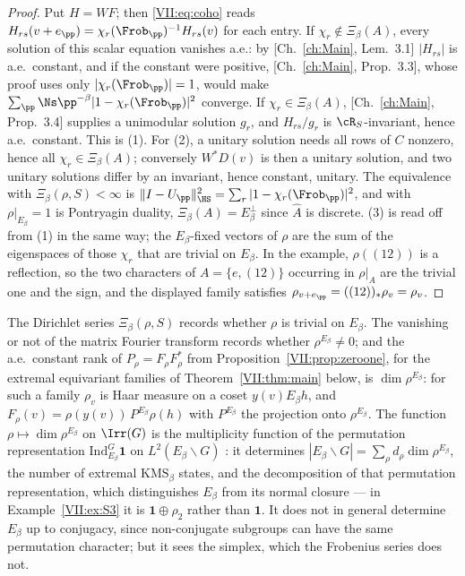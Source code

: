 \begin{proof}
Put $H=WF$; then \eqref{VII:eq:coho} reads $H_{rs}(v+e_\pp)=\chi_r(\Frob_\pp)^{-1}H_{rs}(v)$ for
each entry. If $\chi_r\notin\Xi_\beta(A)$, every solution of this scalar equation vanishes
a.e.: by [Ch.~\ref{ch:Main}, Lem.~3.1] $|H_{rs}|$ is a.e.\ constant, and if the constant were
positive, [Ch.~\ref{ch:Main}, Prop.~3.3], whose proof uses only $|\chi_r(\Frob_\pp)|=1$, would make
$\sum_\pp\Ns\pp^{-\beta}|1-\chi_r(\Frob_\pp)|^2$ converge. If $\chi_r\in\Xi_\beta(A)$,
[Ch.~\ref{ch:Main}, Prop.~3.4] supplies a unimodular solution $g_r$, and $H_{rs}/g_r$ is
$\cR_S$-invariant, hence a.e.\ constant. This is (1). For (2), a unitary solution needs all
rows of $C$ nonzero, hence all $\chi_r\in\Xi_\beta(A)$; conversely $W^*D(v)$ is then a
unitary solution, and two unitary solutions differ by an invariant, hence constant, unitary.
The equivalence with $\Xi_\beta(\rho,S)<\infty$ is $\|I-U_\pp\|_{\HS}^2=\sum_r|1-\chi_r(\Frob_\pp)|^2$,
and with $\rho|_{E_\beta}=1$ is Pontryagin duality, $\Xi_\beta(A)=E_\beta^\perp$ since
$\widehat A$ is discrete. (3) is read off from (1) in the same way; the $E_\beta$-fixed
vectors of $\rho$ are the sum of the eigenspaces of those $\chi_r$ that are trivial on
$E_\beta$. In the example, $\rho((12))$ is a reflection, so the two characters of
$A=\{e,(12)\}$ occurring in $\rho|_A$ are the trivial one and the sign, and the
displayed family satisfies $\rho_{v+e_\pp}=((12))_*\rho_v=\rho_v$.
\end{proof}

\begin{remark}\label{VII:rem:fixed}
The Dirichlet series $\Xi_\beta(\rho,S)$ records whether $\rho$ is trivial on $E_\beta$.
The vanishing or not of the matrix Fourier transform records whether $\rho^{E_\beta}\ne0$;
and the a.e.\ constant rank of $P_\rho=F_\rho F_\rho^*$ from Proposition~\ref{VII:prop:zeroone},
for the extremal equivariant families of Theorem~\ref{VII:thm:main} below, is
$\dim\rho^{E_\beta}$: for such a family $\rho_v$ is Haar measure on a coset $y(v)E_\beta h$,
and $F_\rho(v)=\rho(y(v))\,P^{E_\beta}\rho(h)$ with $P^{E_\beta}$ the projection onto
$\rho^{E_\beta}$. The function $\rho\mapsto\dim\rho^{E_\beta}$ on $\Irr(G)$ is the multiplicity function
of the permutation representation $\mathrm{Ind}_{E_\beta}^G\mathbf 1$ on $L^2(E_\beta\backslash G)$
\cite{Mackey}: it determines $|E_\beta\backslash G|=\sum_\rho d_\rho\dim\rho^{E_\beta}$, the
number of extremal $\mathrm{KMS}_\beta$ states, and the decomposition of that permutation
representation, which distinguishes $E_\beta$ from its normal closure --- in
Example~\ref{VII:ex:S3} it is $\mathbf 1\oplus\rho_2$ rather than $\mathbf 1$. It does not in
general determine $E_\beta$ up to conjugacy, since non-conjugate subgroups can have the
same permutation character; but it sees the simplex, which the Frobenius series does not.
\end{remark}

